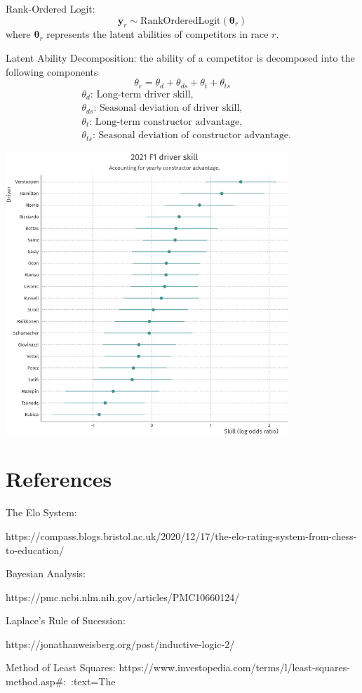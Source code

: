 \documentclass[12pt]{article}
\begin{document}
Rank-Ordered Logit:
\[
\mathbf{y}_r \sim \text{RankOrderedLogit}(\boldsymbol{\theta}_r)
\]
where \(\boldsymbol{\theta}_r\) represents the latent abilities of competitors in race \(r\).

Latent Ability Decomposition: 
the ability of a competitor is decomposed into the following components
\[
\theta_c = \theta_d + \theta_{ds} + \theta_t + \theta_{ts}
\]
\[
\begin{aligned}
&\theta_d \text{: Long-term driver skill,} \\
&\theta_{ds} \text{: Seasonal deviation of driver skill,} \\
&\theta_t \text{: Long-term constructor advantage,} \\
&\theta_{ts} \text{: Seasonal deviation of constructor advantage.}
\end{aligned}
\]



\begin{center}
    \includegraphics[width=0.8\textwidth]{driver skill.jpg}
    \end{center}

\newpage
\section*{References}
\begin{flushleft}
The Elo System:

https://compass.blogs.bristol.ac.uk/2020/12/17/the-elo-rating-system-from-chess-to-education/

Bayesian Analysis:

https://pmc.ncbi.nlm.nih.gov/articles/PMC10660124/

Laplace's Rule of Sucession:

https://jonathanweisberg.org/post/inductive-logic-2/

Method of Least Squares:
https://www.investopedia.com/terms/l/least-squares-method.asp#:~:text=The%
\end{flushleft}
\end{document}
